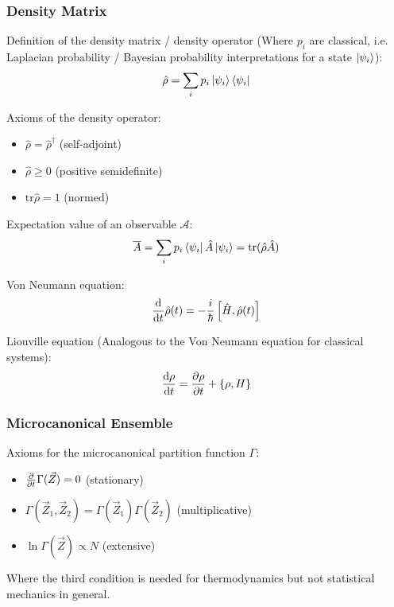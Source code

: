 		\subsubsection{Density Matrix}
			\noindent
			Definition of the density matrix / density operator (Where $p_i$ are classical, i.e. Laplacian probability / Bayesian probability interpretations for a state $\Ket{\psi_i}$):
			\begin{equation}
				\hat{\rho} = \sum_i p_i \Ket{\psi_i}\Bra{\psi_i}
			\end{equation}

			\noindent
			Axioms of the density operator:%
			\begin{itemize}\itemsep -0pt	%
				\item $\hat{\rho} = \hat{\rho}^\dagger$ \hfill{(self-adjoint)}
				\item $\hat{\rho} \ge 0 $ \hfill{(positive semidefinite)}
				\item $\mathrm{tr} \hat{\rho} = 1$ \hfill{(normed)}
			\end{itemize}

			\noindent
			Expectation value of an observable $\mathcal{A}$:
			\begin{equation}
				\overline{A} = \sum_i p_i \Bra{\psi_i}\hat{A}\Ket{\psi_i} = \mathrm{tr} (\hat{\rho}\hat{A})
			\end{equation}

			\noindent
			Von Neumann equation:
			\begin{equation}
				\frac{\mathrm{d} }{\mathrm{d} t}\hat{\rho}(t) = -\frac{i}{\hbar} \left[\hat{H},\hat{\rho}(t)\right]
			\end{equation}

			\noindent
			Liouville equation (Analogous to the Von Neumann equation for classical systems):
			\begin{equation}
				\frac{\mathrm{d} \rho}{\mathrm{d} t} = \frac{\partial \rho}{\partial t}+\left\lbrace \rho,H \right\rbrace
			\end{equation}

		\subsubsection{Microcanonical Ensemble}
			\noindent
			Axioms for the microcanonical partition function $\Gamma$:
			\begin{itemize}\itemsep -0pt	%
				\item $\frac{\partial }{\partial t}\Gamma(\vec{Z}) = 0$ \hfill{(stationary)}
				\item $\Gamma(\vec{Z}_1,\vec{Z}_2) = \Gamma(\vec{Z}_1)\Gamma(\vec{Z}_2) $ \hfill{(multiplicative)}
				\item $\ln\Gamma(\vec{Z}) \propto N$ \hfill{(extensive)}
			\end{itemize}
			Where the third condition is needed for thermodynamics but not statistical mechanics in general.

